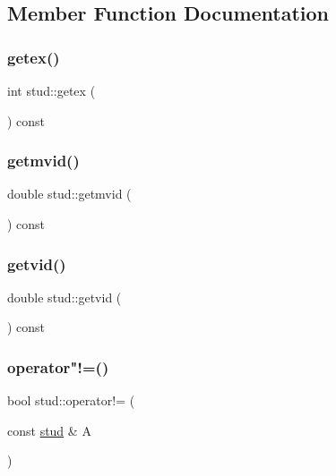 \subsection{Member Function Documentation}
\mbox{\label{structstud_a7b9cf0ded33d6a59ef2ef045d70980ba}} 
\subsubsection{\texorpdfstring{getex()}{getex()}}
{\footnotesize\ttfamily int stud\+::getex (\begin{DoxyParamCaption}{ }\end{DoxyParamCaption}) const\hspace{0.3cm}{\ttfamily [inline]}}

\mbox{\label{structstud_a79c64a6d3b9c76c24593588d30b8c661}} 
\subsubsection{\texorpdfstring{getmvid()}{getmvid()}}
{\footnotesize\ttfamily double stud\+::getmvid (\begin{DoxyParamCaption}{ }\end{DoxyParamCaption}) const\hspace{0.3cm}{\ttfamily [inline]}}

\mbox{\label{structstud_a9c5ae09dd2a7253655547095cb2ecdd1}} 
\subsubsection{\texorpdfstring{getvid()}{getvid()}}
{\footnotesize\ttfamily double stud\+::getvid (\begin{DoxyParamCaption}{ }\end{DoxyParamCaption}) const\hspace{0.3cm}{\ttfamily [inline]}}

\mbox{\label{structstud_a16dc0913be93da4cbe3b33794bd35349}} 
\subsubsection{\texorpdfstring{operator"!=()}{operator!=()}}
{\footnotesize\ttfamily bool stud\+::operator!= (\begin{DoxyParamCaption}\item[{const \mbox{\hyperlink{structstud}{stud}} \&}]{A }\end{DoxyParamCaption})}

